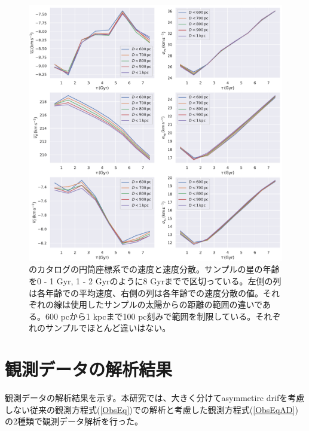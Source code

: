 \begin{figure}[htbp]
	\centering
	\includegraphics[width=15cm]{fig/v_sigma.pdf}
	\caption{\cite{SD18}のカタログの円筒座標系での速度と速度分散。サンプルの星の年齢を0 - 1 Gyr, 1 - 2 Gyrのように8 Gyrまでで区切っている。左側の列は各年齢での平均速度、右側の列は各年齢での速度分散の値。それぞれの線は使用したサンプルの太陽からの距離の範囲の違いである。600 pcから1 kpcまで100 pc刻みで範囲を制限している。それぞれのサンプルでほとんど違いはない。}
	\label{fig:v_sigma}
\end{figure}


\section{観測データの解析結果 \label{観測データの解析結果}}
観測データの解析結果を示す。本研究では、大きく分けてasymmetirc drifを考慮しない従来の観測方程式(\ref{ObsEq})での解析と考慮した観測方程式(\ref{ObsEqAD})の2種類で観測データ解析を行った。

